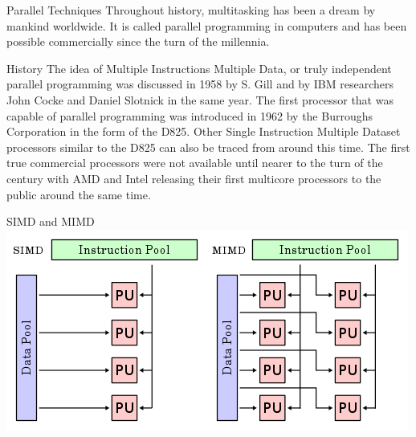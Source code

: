 \documentclass[final]{beamer}
\begin{document}
\begin{frame}{}
\begin{columns}[t]
      
      \begin{column}{.32\linewidth}
        \begin{block}{Parallel Techniques}
          Throughout history, multitasking has been a dream by mankind worldwide. It is called parallel programming in computers and has been possible commercially since the turn of the millennia.
        \end{block}
        
        \begin{block}{History}
          The idea of Multiple Instructions Multiple Data, or truly independent parallel programming was discussed in 1958 by S. Gill and by IBM researchers John Cocke and Daniel Slotnick in the same year. The first processor that was capable of parallel programming was introduced in 1962 by the Burroughs Corporation in the form of the D825. Other Single Instruction Multiple Dataset processors similar to the D825 can also be traced from around this time. The first true commercial processors were not available until nearer to the turn of the century with AMD and Intel releasing their first multicore processors to the public around the same time.
        \end{block}
        
        \begin{block}{SIMD and MIMD}
          \includegraphics[width=\columnwidth]{parallel.png} 
        \end{block}
        

\end{column}
\end{columns}
\end{frame}
\end{document}
